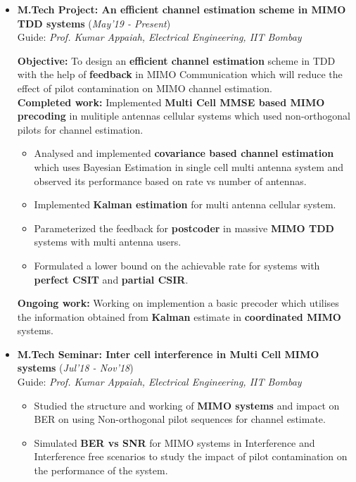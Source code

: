 \documentclass[10pt]{article}
\begin{document}
\begin{itemize}[leftmargin=0.4cm]
\item \textbf{M.Tech Project: An efficient channel estimation scheme in MIMO TDD systems}
\hfill{(\textit{May'19 - Present})} \\
Guide: \textit{Prof. Kumar Appaiah, Electrical Engineering, IIT Bombay}


  \textbf{Objective:} To design an \textbf{efficient channel estimation} scheme in TDD with the help of \textbf{feedback} in MIMO Communication which will reduce the effect of pilot contamination on MIMO channel estimation.\\
%
%
\textbf{Completed work:} Implemented \textbf{Multi Cell MMSE based MIMO precoding} in mulitiple antennas cellular systems which used non-orthogonal pilots for channel estimation.

\begin{itemize}

\item Analysed and implemented \textbf{covariance based channel estimation} which uses Bayesian Estimation in single cell multi antenna system and observed its performance based on rate vs number of antennas.

\item Implemented \textbf{Kalman estimation} for multi antenna cellular system.  

\item Parameterized the feedback for \textbf{postcoder} in massive \textbf{MIMO TDD} systems with multi antenna users. 

\item Formulated a lower bound on the achievable rate for systems with \textbf{perfect CSIT} and \textbf{partial CSIR}.

\end{itemize}


%
\textbf{Ongoing work:} Working on implemention a basic precoder which utilises the information obtained from \textbf{Kalman} estimate in \textbf{coordinated MIMO} systems.


\item \textbf{M.Tech Seminar: Inter cell interference in Multi Cell MIMO systems 
} 
\hfill{(\textit{Jul'18 - Nov'18})}\\
Guide: \textit{Prof. Kumar Appaiah, Electrical Engineering, IIT Bombay}
	\begin{itemize}
	\item Studied the structure and working of \textbf{MIMO systems} and impact on BER on using Non-orthogonal pilot sequences for channel estimate.
	\item Simulated \textbf{BER vs SNR} for MIMO systems in Interference and Interference free scenarios to study the impact of pilot contamination on the performance of the system.

	\end{itemize}
	

\end{itemize}
\end{document}

